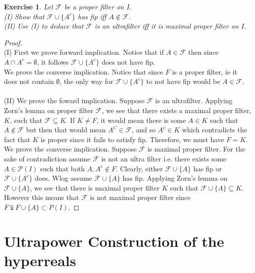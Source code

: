 \documentclass[a4paper, 11pt]{book}
\theoremstyle{plain}
\newtheorem{exercise}{Exercise}[chapter]
\theoremstyle{plain}
\newcommand{\mc}{\mathcal}
\newcommand{\ms}{\mathscr}
\begin{document}
  \begin{exercise}
    Let $\mc{F}$ be a proper filter on $I$. \\
    (I) Show that $\mc{F} \cup \{A^c\}$ has fip iff $A \notin \mc{F}$. \\
    (II) Use (I) to deduce that $\mc{F}$ is an ultrafilter iff it is maximal proper filter on $I$.
  \end{exercise}
  \begin{proof} $ $ \\
    (I) First we prove forward implication. Notice that if $A \in \mc{F}$ then since $A \cap A^c=\emptyset$, it follows $\mc{F} \cup \{A^c\}$ does not have fip. \\
    We prove the converse implication. Notice that since $F$ is a proper filter, ie it does not contain $\emptyset$, the only way for $\mc{F} \cup \{A^c\}$ to not have fip would be $A \in \mc{F}$. \\\\

    (II) We prove the foward implication. Suppose $\mc{F}$ is an ultrafilter. Applying Zorn's lemma on proper filter $\mc{F}$, we see that there exists a maximal proper filter, $K$, such that $\mc{F} \subseteq K$. If $K \not = F$, it would mean there is some $A \in K$ such that $A \not \in \mc{F}$ but then that would mean $A^C \in \mc{F}$, and so $A^c \in K$ which contradicts the fact that $K$ is proper since it fails to satisfy fip. Therefore, we must have $F=K$. \\

    We prove the converse implication. Suppose $\mc{F}$ is maximal proper filter. For the sake of contradiction assume $\mc{F}$ is not an ultra filter i.e. there exists some $A \in \ms{P}(I)$ such that both $A, A^c \notin F$. Clearly, either $\mc{F} \cup \{A\}$ has fip or $\mc{F} \cup \{A^c\}$ does. Wlog assume $\mc{F} \cup \{A\}$ has fip. Applying Zorn's lemma on $\mc{F} \cup \{A\}$, we see that there is maximal proper filter $K$ such that $\mc{F} \cup \{A\} \subseteq K$. However this means that $\mc{F}$ is not maximal proper filter since $F \subsetneqq F \cup \{A\} \subset P(I)$.
  \end{proof}

\chapter{Ultrapower Construction of the hyperreals}
\end{document}
